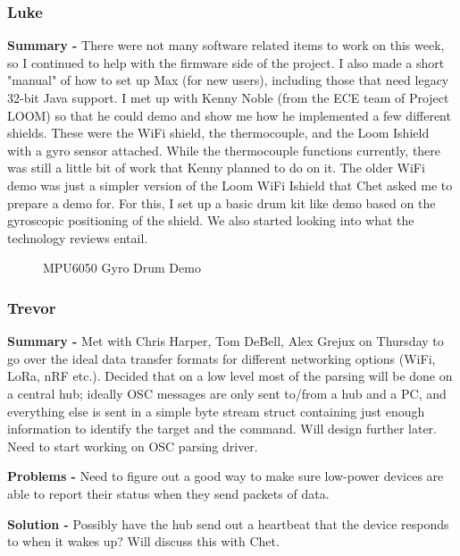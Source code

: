 \documentclass[onecolumn, draftclsnofoot,10pt, compsoc]{IEEEtran}
\begin{document}
\subsubsection*{Luke}
    \begin{adjustwidth}{2.5em}{0pt}
    \textbf{Summary -} There were not many software related items to work on this week, so I continued to help with the firmware side of the project. I also made a short "manual" of how to set up Max (for new users), including those that need legacy 32-bit Java support. I met up with Kenny Noble (from the ECE team of Project LOOM) so that he could demo and show me how he implemented a few different shields. These were the WiFi shield, the thermocouple, and the Loom Ishield with a gyro sensor attached. While the thermocouple functions currently, there was still a little bit of work that Kenny planned to do on it. The older WiFi demo was just a simpler version of the Loom WiFi Ishield that Chet asked me to prepare a demo for. For this, I set up a basic drum kit like demo based on the gyroscopic positioning of the shield. We also started looking into what the technology reviews entail.
    \end{adjustwidth}


    \begin{figure}[H]
        \centering
        \caption{MPU6050 Gyro Drum Demo}
        \label{fig:drum_demo}
        \qquad
    \end{figure}


\subsubsection*{Trevor}
    \begin{adjustwidth}{2.5em}{0pt}
    \textbf{Summary -} Met with Chris Harper, Tom DeBell, Alex Grejux on Thursday to go over the ideal data transfer formats for different networking options (WiFi, LoRa, nRF etc.). Decided that on a low level most of the parsing will be done on a central hub; ideally OSC messages are only sent to/from a hub and a PC, and everything else is sent in a simple byte stream struct containing just enough information to identify the target and the command. Will design further later. Need to start working on OSC parsing driver.
    
    \textbf{Problems -} Need to figure out a good way to make sure low-power devices are able to report their status when they send packets of data.
    \end{adjustwidth}
    \begin{adjustwidth}{5em}{0pt}
    \textbf{Solution -} Possibly have the hub send out a heartbeat that the device responds to when it wakes up? Will discuss this with Chet.
    \end{adjustwidth}
\end{document}
